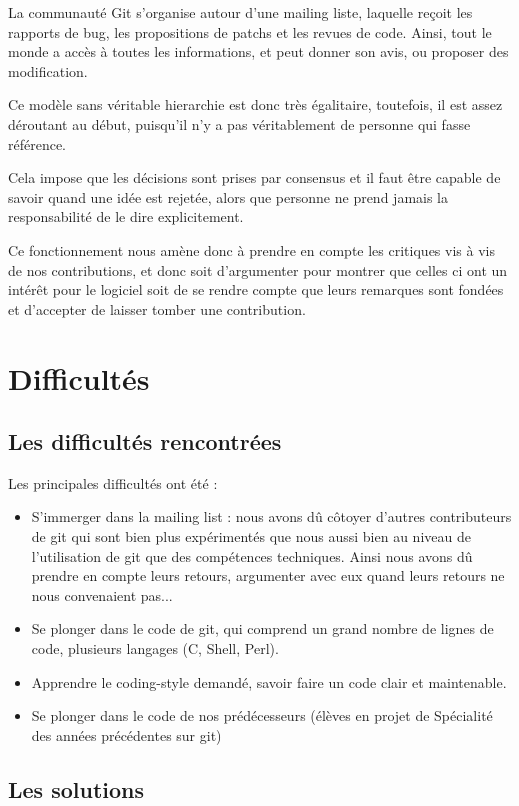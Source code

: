 \documentclass[a4paper, 12pt]{article}
\begin{document}
La communauté Git s'organise autour d'une mailing liste, laquelle reçoit les rapports de bug, les propositions de patchs et les revues de code. Ainsi, tout le monde a accès à toutes les informations, et peut donner son avis, ou proposer des modification.

Ce modèle sans véritable hierarchie est donc très égalitaire, toutefois, il est assez déroutant au début, puisqu'il n'y a pas véritablement de personne qui fasse référence.

Cela impose que les décisions sont prises par consensus et il faut être capable de savoir quand une idée est rejetée, alors que personne ne prend jamais la responsabilité de le dire explicitement.

Ce fonctionnement nous amène donc à prendre en compte les critiques vis à vis de nos contributions, et donc soit d'argumenter pour montrer que celles ci ont un intérêt pour le logiciel soit de se rendre compte que leurs remarques sont fondées et d'accepter de laisser tomber une contribution.

\section{Difficultés}

\subsection{Les difficultés rencontrées}

Les principales difficultés ont été :
\begin{itemize}
\item S'immerger dans la mailing list : nous avons dû côtoyer d'autres contributeurs de git qui sont bien plus expérimentés que nous aussi bien au niveau de l'utilisation de git que des compétences techniques. Ainsi nous avons dû prendre en compte leurs retours, argumenter avec eux quand leurs retours ne nous convenaient pas...
\item Se plonger dans le code de git, qui comprend un grand nombre de lignes de code, plusieurs langages (C, Shell, Perl).
\item Apprendre le coding-style demandé, savoir faire un code clair et maintenable.
\item Se plonger dans le code de nos prédécesseurs (élèves en projet de Spécialité des années précédentes sur git)
\end{itemize}

\subsection{Les solutions}
\end{document}
